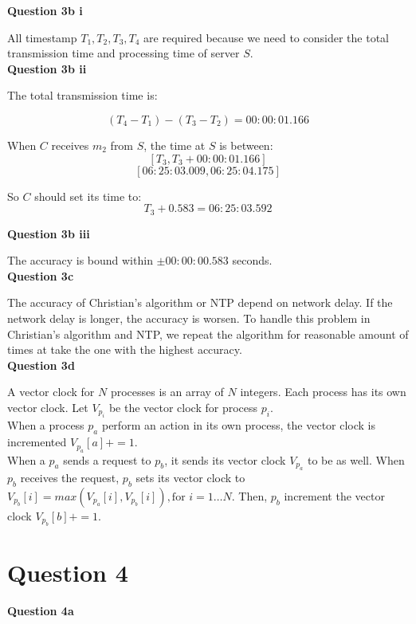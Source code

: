 \documentclass[11pt,a4paper]{report}
\begin{document}
\begin{multicols*}{2}
\noindent \textbf{Question 3b i}

\noindent All timestamp $T_1,T_2,T_3,T_4$ are required because we need to consider the total transmission time and processing time of server $S$.\\

\noindent \textbf{Question 3b ii}

\noindent The total transmission time is:

$$(T_4 - T_1) - (T_3 - T_2) = 00:00:01.166$$

\noindent When $C$ receives $m_2$ from $S$, the time at $S$ is between: 
$$[T_3, T_3 + 00:00:01.166]$$
$$[06:25:03.009, 06:25:04.175]$$

\noindent So $C$ should set its time to:
$$T_3 + 0.583 = 06:25:03.592$$

\noindent \textbf{Question 3b iii}

\noindent The accuracy is bound within $\pm 00:00:00.583$ seconds.\\

\noindent \textbf{Question 3c}

\noindent The accuracy of Christian's algorithm or NTP depend on network delay. If the network delay is longer, the accuracy is worsen. To handle this problem in Christian's algorithm and NTP, we repeat the algorithm for reasonable amount of times at take the one with the highest accuracy.\\

\noindent \textbf{Question 3d}

\noindent A vector clock for $N$ processes is an array of $N$ integers. Each process has its own vector clock. Let $V_{p_i}$ be the vector clock for process $p_i$.\\

\noindent When a process $p_a$ perform an action in its own process, the vector clock is incremented $V_{p_a}[a] += 1$.\\

\noindent When a $p_a$ sends a request to $p_b$, it sends its vector clock $V_{p_a}$ to be as well. When $p_b$ receives the request, $p_b$ sets its vector clock to $V_{p_b}[i] = max(V_{p_a}[i], V_{p_b}[i]), \text{for } i=1\ldots N$. Then, $p_b$ increment the vector clock $V_{p_b}[b] += 1$.

\section{Question 4}

\noindent \textbf{Question 4a}


\end{multicols*}
\end{document}
